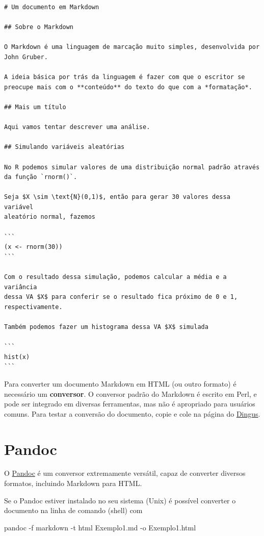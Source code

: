 \documentclass[10pt,a4paper]{book}
\newenvironment{Shaded}{\begin{snugshade}}{\end{snugshade}}
\newcommand{\ExtensionTok}[1]{#1}
\newcommand{\NormalTok}[1]{#1}
\begin{document}
\begin{verbatim}
# Um documento em Markdown

## Sobre o Markdown

O Markdown é uma linguagem de marcação muito simples, desenvolvida por
John Gruber.

A ideia básica por trás da linguagem é fazer com que o escritor se
preocupe mais com o **conteúdo** do texto do que com a *formatação*.

## Mais um título

Aqui vamos tentar descrever uma análise.

## Simulando variáveis aleatórias

No R podemos simular valores de uma distribuição normal padrão através
da função `rnorm()`.

Seja $X \sim \text{N}(0,1)$, então para gerar 30 valores dessa variável
aleatório normal, fazemos

```
(x <- rnorm(30))
```

Com o resultado dessa simulação, podemos calcular a média e a variância
dessa VA $X$ para conferir se o resultado fica próximo de 0 e 1,
respectivamente.

Também podemos fazer um histograma dessa VA $X$ simulada

```
hist(x)
```
\end{verbatim}

Para converter um documento Markdown em HTML (ou outro formato) é
necessário um \textbf{conversor}. O conversor padrão do Markdown é
escrito em Perl, e pode ser integrado em diversas ferramentas, mas não é
apropriado para usuários comuns. Para testar a conversão do documento,
copie e cole na página do
\href{http://daringfireball.net/projects/markdown/dingus}{Dingus}.

\section{Pandoc}\label{pandoc}

O \href{http://pandoc.org/}{Pandoc} é um conversor extremamente
versátil, capaz de converter diversos formatos, incluindo Markdown para
HTML.

Se o Pandoc estiver instalado no seu sistema (Unix) é possível converter
o documento na linha de comando (shell) com

\begin{Shaded}
\begin{Highlighting}[]
\ExtensionTok{pandoc}\NormalTok{ -f markdown -t html Exemplo1.md -o Exemplo1.html}
\end{Highlighting}
\end{Shaded}
\end{document}
